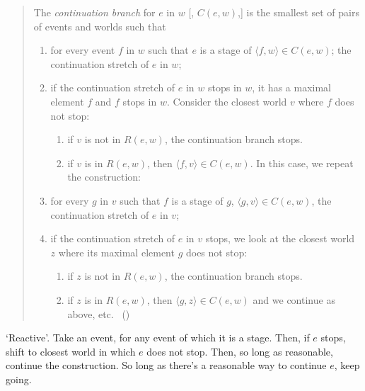 \begin{note}
  \begin{quote}
    The \emph{continuation branch} for \(e\) in \(w\) [, \(C(e,w)\),] is the smallest set of pairs of events and worlds such that
    \begin{enumerate}
    \item
      for every event \(f\) in \(w\) such that \(e\) is a stage of \(\langle f,w \rangle \in C(e,w)\);
      the continuation stretch of \(e\) in \(w\);
    \item
      if the continuation stretch of \(e\) in \(w\) stops in \(w\), it has a maximal element \(f\) and \(f\) stops in \(w\).
      Consider the closest world \(v\) where \(f\) does not stop:
      \begin{enumerate}[label=--]
      \item
        if \(v\) is not in \(R(e, w)\), the continuation branch stops.
      \item
        if \(v\) is in \(R(e, w)\), then \(\langle f,v \rangle \in C(e,w)\).
        In this case, we repeat the construction:
      \end{enumerate}
    \item
      for every \(g\) in \(v\) such that \(f\) is a stage of \(g\), \(\langle g,v \rangle \in C(e,w)\), the continuation stretch of \(e\) in \(v\);
    \item
      if the continuation stretch of \(e\) in \(v\) stops, we look at the closest world \(z\) where its maximal element \(g\) does not stop:
      \begin{enumerate}[label=--]
      \item
        if \(z\) is not in \(R(e, w)\), the continuation branch stops.
      \item
        if \(z\) is in \(R(e, w)\), then \(\langle g,z \rangle \in C(e,w)\) and we continue as above, etc.%
        \mbox{ }\hfill\mbox{(\citeyear[26--27]{Landman:1992wh})}
      \end{enumerate}
    \end{enumerate}
  \end{quote}

  `Reactive'.
  Take an event, for any event of which it is a stage.
  Then, if \(e\) stops, shift to closest world in which \(e\) does not stop.
  Then, so long as reasonable, continue the construction.
  So long as there's a reasonable way to continue \(e\), keep going.
\end{note}


